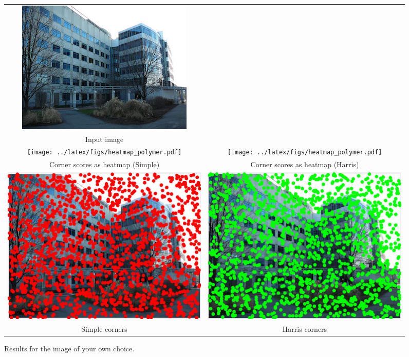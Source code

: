 \documentclass[10pt,letterpaper]{article}
\begin{document}
\begin{enumerate}
\begin{figure}[h]
\centering
\begin{tabular}{cc}
\includegraphics[width=0.48\linewidth]{../latex/figs/polymer-science-umass.jpg} & \\
Input image & \\
\texttt{[image: ../latex/figs/heatmap\_polymer.pdf]} &
\texttt{[image: ../latex/figs/heatmap\_polymer.pdf]} \\
 Corner scores as heatmap (Simple) & Corner scores as heatmap (Harris) \\
\includegraphics[width=0.48\linewidth]{../latex/figs/polymer_simple_corner.png} &
\includegraphics[width=0.48\linewidth]{../latex/figs/polymer_harris.png} \\
Simple corners & Harris corners  \\
\end{tabular}
\caption{\label{fig:own} Results for the image of your own choice.}
\vspace{-2in}
\end{figure}

\end{enumerate}
\end{document}
